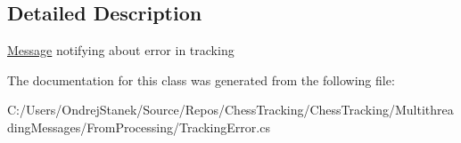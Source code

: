 \subsection{Detailed Description}
\mbox{\hyperlink{class_chess_tracking_1_1_multithreading_messages_1_1_message}{Message}} notifying about error in tracking 



The documentation for this class was generated from the following file\+:\begin{DoxyCompactItemize}
\item 
C\+:/\+Users/\+Ondrej\+Stanek/\+Source/\+Repos/\+Chess\+Tracking/\+Chess\+Tracking/\+Multithreading\+Messages/\+From\+Processing/Tracking\+Error.\+cs\end{DoxyCompactItemize}
